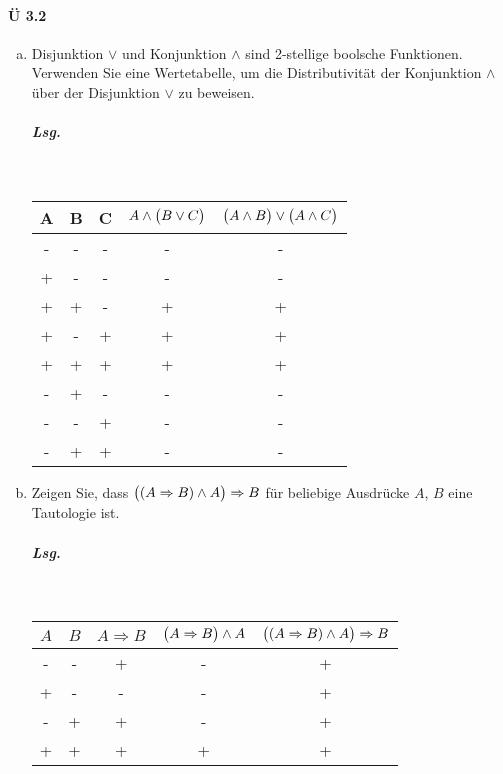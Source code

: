 \documentclass{scrreprt}
\begin{document}
\paragraph{Ü 3.2}
\begin{enumerate}[(a)]
\item Disjunktion $\lor$ und Konjunktion $\land$ sind 2-stellige boolsche
  Funktionen.
  Verwenden Sie eine Wertetabelle, um die Distributivität der Konjunktion $\land$
  über der Disjunktion $\lor$ zu beweisen.

  \subparagraph{Lsg.}\:\\
  \begin{tabular}{|c|c|c|cc|}
    \hline
    A & B & C & $A \land \qty\big(B \lor C)$ & $\qty\big(A \land B) \lor \qty\big(A \land C)$ \\
    \hline
    - & - & - & - & - \\
    + & - & - & - & - \\
    + & + & - & + & + \\
    + & - & + & + & + \\
    + & + & + & + & + \\
    - & + & - & - & - \\
    - & - & + & - & - \\
    - & + & + & - & - \\
    \hline
  \end{tabular}

\item Zeigen Sie, dass $\qty\big((A \Rightarrow B) \land A) \Rightarrow B$ für
  beliebige Ausdrücke $A$, $B$ eine Tautologie ist.

  \subparagraph{Lsg.}\:\\
  \begin{tabular}{|c|c|ccc|}
    \hline
    $A$ & $B$ & $A \Rightarrow B$ & $\qty\big(A \Rightarrow B) \land A$ & $\qty\big((A \Rightarrow B) \land A) \Rightarrow B$ \\
    \hline
    - & - & + & - & + \\
    + & - & - & - & + \\
    - & + & + & - & + \\
    + & + & + & + & + \\
    \hline
  \end{tabular}


\end{enumerate}
\end{document}
